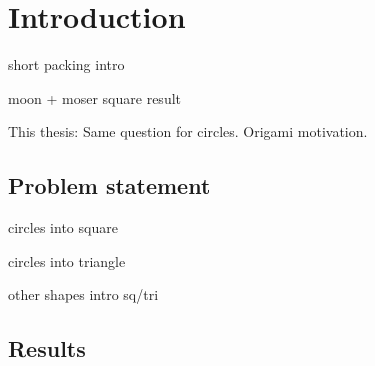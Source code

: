 \documentclass[a4paper,style=print,bibliography=totoc,nexus,lnum,extramargin]{tubsbook}
\begin{document}
\mainmatter %

\chapter{Introduction}

short packing intro

moon + moser square result

This thesis: Same question for circles. Origami motivation.

%
%
%
%
%
%

\section{Problem statement}

circles into square

circles into triangle

other shapes intro sq/tri

\section{Results}
\end{document}
